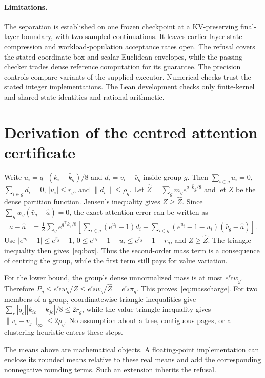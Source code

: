 \documentclass[10pt]{article}
\theoremstyle{definition}\newtheorem{definition}[theorem]{Definition}
\begin{document}
\paragraph{Limitations.}
The separation is established on one frozen checkpoint at a KV-preserving final-layer boundary, with two sampled continuations. It leaves earlier-layer state compression and workload-population acceptance rates open. The refusal covers the stated coordinate-box and scalar Euclidean envelopes, while the passing checker trades dense reference computation for its guarantee. The precision controls compare variants of the supplied executor. Numerical checks trust the stated integer implementations. The Lean development checks only finite-kernel and shared-state identities and rational arithmetic.

\appendix
\section{Derivation of the centred attention certificate}
\label{app:centred}
Write $u_i=q^\top(k_i-\bar k_g)/8$ and $d_i=v_i-\bar v_g$ inside group $g$. Then $\sum_{i\in g}u_i=0$, $\sum_{i\in g}d_i=0$, $|u_i|\leq r_g$, and $\|d_i\|\leq\rho_g$. Let $\hat Z=\sum_gm_ge^{q^\top\bar k_g/8}$ and let $Z$ be the dense partition function. Jensen's inequality gives $Z\geq\hat Z$. Since $\sum_gw_g(\bar v_g-\hat a)=0$, the exact attention error can be written as
\begin{align*}
 a-\hat a
 &=\frac1Z\sum_g e^{q^\top\bar k_g/8}
 \left[\sum_{i\in g}(e^{u_i}-1)d_i
       +\sum_{i\in g}(e^{u_i}-1-u_i)(\bar v_g-\hat a)\right].
\end{align*}
Use $|e^{u_i}-1|\leq e^{r_g}-1$, $0\leq e^{u_i}-1-u_i\leq e^{r_g}-1-r_g$, and $Z\geq\hat Z$. The triangle inequality then gives~\eqref{eq:box}. Thus the second-order mass term is a consequence of centring the group, while the first term still pays for value variation.

For the lower bound, the group's dense unnormalized mass is at most $e^{r_g}w_g$. Therefore
$P_g\leq e^{r_g}w_g/Z\leq e^{r_g}w_g/\hat Z=e^{r_g}\pi_g$.
This proves~\eqref{eq:masscharge}. For two members of a group, coordinatewise triangle inequalities give
$\sum_c|q_c||k_{ic}-k_{jc}|/8\leq2r_g$, while the value triangle inequality gives $\|v_i-v_j\|_\infty\leq2\rho_g$. No assumption about a tree, contiguous pages, or a clustering heuristic enters these steps.

The means above are mathematical objects. A floating-point implementation can enclose its rounded means relative to these real means and add the corresponding nonnegative rounding terms. Such an extension inherits the refusal.
\end{document}

